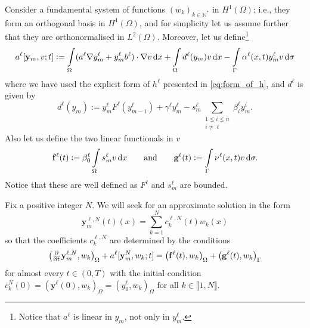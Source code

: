 \documentclass[11pt]{article}
\newcommand{\N}{\mathbb{N}}
\newcommand{\llb}{\llbracket}
\newcommand{\rrb}{\rrbracket}
\newcommand{\by}{\mathbf{y}}
\begin{document}
	Consider a fundamental system of functions \((w_k)_{k\in \N^*}\) in \(H^1(\Omega)\); i.e., they form an orthogonal basis in \(H^1(\Omega)\), and for simplicity let us assume further that they are orthonormalised in \(L^2(\Omega)\). Moreover, let us define\footnote{Notice that \(a^\ell\) is linear in \( y_m\), not only in \(y_m^\ell\).}
	\[
		a^\ell [\by_m,v;t] := 
		\int\limits_\Omega (a^\ell \nabla y_m^\ell + y_m^\ell b^\ell ) \cdot \nabla v \dif x + \int\limits_\Omega d^\ell (y_m) v \dif x
		- \int\limits_\Gamma \alpha^\ell (x,t) y_m^\ell v \dif \sigma
	\]
	where we have used the explicit form of \(h^\ell\) presented in \eqref{eq:form_of_h}, and \(d^\ell\) is given by
	\[
		d^\ell (y_m) := y_m^\ell F^\ell(y_{m-1}^\ell) + \gamma^\ell y_m^\ell - s_m^\ell \sum_{\substack{1\le i\le n\\ i\neq \ell}} \beta_i^\ell y_m^i.
	\]
	Also let us define the two linear functionals in \(v\)
	\[
		\mathbf{f}^\ell (t) := \beta_0^\ell \int\limits_\Omega s_m^\ell  v \dif x
		\qquad\text{and}\qquad
		\mathbf{g}^\ell (t) :=  \int\limits_\Gamma \nu^\ell (x,t)  v \dif \sigma.
	\]
	Notice that these are well defined as \(F^\ell\) and \(s_m^\ell\) are bounded.
	
	
	
	
	
	Fix a positive integer \(N\). We will seek for an approximate solution in the form
	\begin{equation}
	\label{eq:ansatz}
		\mathbf{y}_m^{\ell,N} (t)(x) = \sum_{k=1}^N c_k^{\ell,N} (t) w_k(x)
	\end{equation}
	so that the coefficients \( c_k^{\ell,N} \) are determined by the conditions 
	\begin{equation}
	\label{sys-pde-pre-galerkin}
		\big(\pd{ }{t} \by_m^{\ell,N}, w_k\big)_\Omega + 
		a^\ell [\mathbf y_m^{N}, w_k; t] 
		=
		\big( \mathbf{f}^\ell (t), w_k \big)_{\Omega} + \big(\mathbf{g}^\ell (t),  w_k \big)_{\Gamma}
	\end{equation}
	for almost every \(t\in (0,T)\) with the initial condition \( c_k^N (0) =  (\by^\ell (0), w_k)_\Omega = (y_0^\ell, w_k)_\Omega\)  for all \(k \in \llb 1,N\rrb\). 
	
\end{document}
